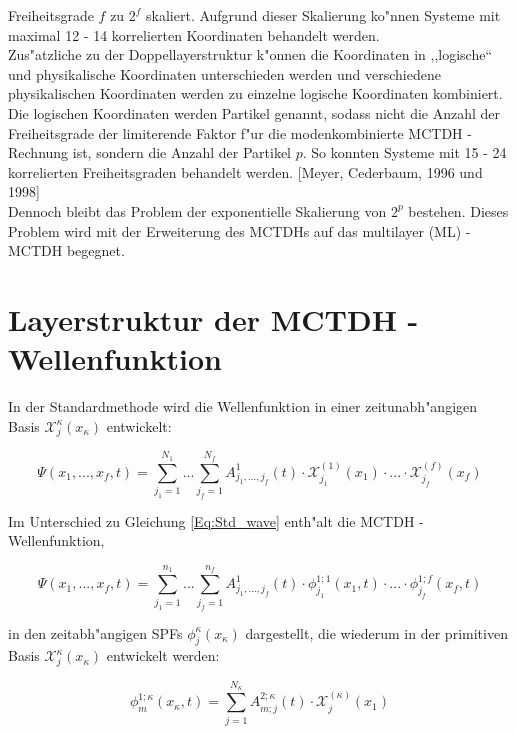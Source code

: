 Freiheitsgrade $f$ zu $2^f$ skaliert. Aufgrund dieser Skalierung ko"nnen Systeme mit maximal 12 - 14 korrelierten Koordinaten behandelt werden.
  \\ Zus"atzliche zu der Doppellayerstruktur k"onnen die Koordinaten in ,,logische`` und physikalische Koordinaten unterschieden werden und
verschiedene physikalischen Koordinaten werden zu einzelne logische Koordinaten kombiniert. Die logischen Koordinaten werden Partikel genannt, sodass
nicht die Anzahl der Freiheitsgrade der limiterende Faktor f"ur die modenkombinierte MCTDH - Rechnung ist,
sondern die Anzahl der Partikel $p$. So konnten Systeme mit 15 - 24 korrelierten Freiheitsgraden behandelt werden. [Meyer, Cederbaum, 1996 und 1998]
  \\Dennoch  bleibt das Problem der exponentielle Skalierung von $2^p$ bestehen. Dieses Problem wird mit der Erweiterung des MCTDHs auf das multilayer (ML) - MCTDH
begegnet. 


\section{Layerstruktur der MCTDH - Wellenfunktion}

In der Standardmethode wird die Wellenfunktion in einer zeitunabh"angigen Basis $\mathcal{X}^{\kappa}_{j}(x_{\kappa})$ entwickelt:

 \begin{equation}
 \Psi(x_{1},..., x_{f}, t)=\sum^{N_{1}}_{j_{1}=1} ... \sum^{N_{f}}_{j_{f}=1} A^{1}_{j_{1}, ..., j_{f}}(t)\cdot \mathcal{X}^{(1)}_{j_{1}}(x_{1}) \cdot ... \cdot \mathcal{X}^{(f)}_{j_{f}}(x_{f})
 \label{Eq:Std_wave}
 \end{equation}

Im Unterschied zu Gleichung \ref{Eq:Std_wave} enth"alt die MCTDH - Wellenfunktion,

 \begin{equation}
 \Psi(x_{1},..., x_{f}, t)=\sum^{n_{1}}_{j_{1}=1} ... \sum^{n_{f}}_{j_{f}=1} A^{1}_{j_{1}, ..., j_{f}}(t)
 \cdot \phi^{1;1}_{j_{1}}(x_{1}, t) \cdot ... \cdot \phi^{1;f}_{j_{f}}(x_{f}, t)
 \label{Eq:mctdh_wave}
 \end{equation}

in den zeitabh"angigen SPFs $\phi^{\kappa}_{j}(x_{\kappa})$ dargestellt, die wiederum in der primitiven Basis $\mathcal{X}^{\kappa}_{j}(x_{\kappa})$ entwickelt werden:

\begin{equation}
 \phi^{1;\kappa}_{m} (x_{\kappa}, t)=\sum^{N_{\kappa}}_{j=1} A^{2;\kappa}_{m;j}(t) \cdot \mathcal{X}^{(\kappa)}_{j}(x_{1})
 \label{Eq:Std_wave}
 \end{equation}


